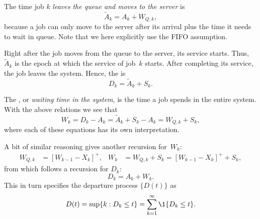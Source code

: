 The time job $k$ \emph{leaves the queue and moves to the server} is
\begin{equation*}
 \tilde A_k = A_k + W_{Q,k},
\end{equation*}
because a job can only move to the server after its arrival plus the
time it needs to wait in queue.  Note that we here explicitly use the
FIFO assumption.

Right after the job moves from the queue to the server, its service starts.  Thus,~$\tilde A_{k}$ is the epoch at which the service of job~$k$ starts. After completing its service,
the job leaves the system. Hence, the  is
\begin{equation*}
  D_k = \tilde A_{k} + S_k.
\end{equation*}

The , or \emph{waiting time in the system}, is the
time a job spends in the entire system. With the above relations we
see that
\begin{equation}
  W_k = D_k - A_k = \tilde A_{k} + S_k -A_k = W_{Q,k} + S_k,
\end{equation}
where each of these equations has its own interpretation. 

A bit of similar reasoning gives another recursion for~$W_k$:
\begin{align}
  \label{eq:59}
  W_{Q,k} &= [W_{k-1} - X_k]^+, &
  W_{k} &= W_{Q,k} + S_k = [W_{k-1} - X_k]^+ + S_k,
\end{align}
from which follows a recursion for $D_k$:
\begin{equation}
  D_k = A_k + W_k.
\end{equation}
This in turn specifies the departure process $\{D(t)\}$ as
\begin{equation*}
  D(t) = \sup\{k : D_k \leq t\} = \sum_{k=1}^\infty \1{D_k \leq t}.
\end{equation*}


